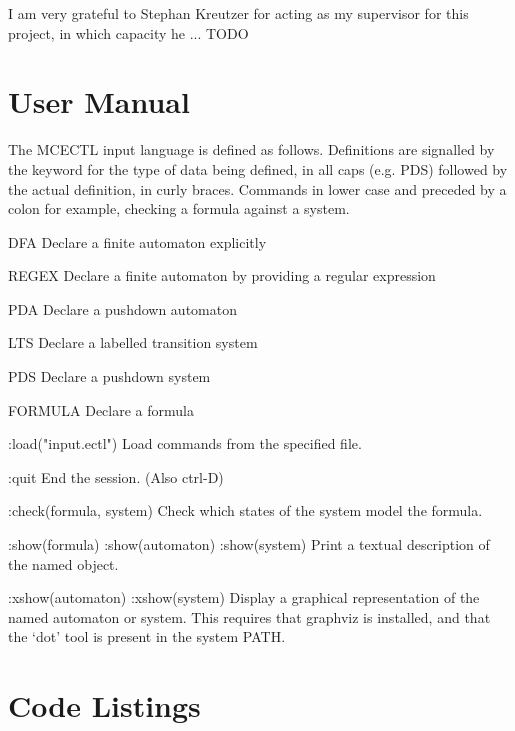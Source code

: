\documentclass[11pt]{article}
\begin{document}
I am very grateful to Stephan Kreutzer for acting as my supervisor for this project, in which capacity he ... TODO


{}


\appendix
\section{User Manual}

The MCECTL input language is defined as follows.
Definitions are signalled by the keyword for the type of data being defined, in all caps (e.g. PDS) followed by the actual definition, in curly braces.
Commands in lower case and preceded by a colon 
for example, checking a formula against a system.

DFA
Declare a finite automaton explicitly

REGEX
Declare a finite automaton by providing a regular expression

PDA
Declare a pushdown automaton

LTS
Declare a labelled transition system

PDS
Declare a pushdown system 

FORMULA
Declare a formula

:load("input.ectl")
Load commands from the specified file.

:quit
End the session. (Also ctrl-D)

:check(formula, system)
Check which states of the system model the formula.

:show(formula)
:show(automaton)
:show(system)
Print a textual description of the named object.

:xshow(automaton)
:xshow(system)
Display a graphical representation of the named automaton or system.
This requires that graphviz is installed, and that the `dot' tool is present in
the system PATH.



\section{Code Listings}
\end{document}
